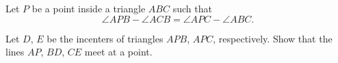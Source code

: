 Let $ P$ be a point inside a triangle $ ABC$ such that
\[ \angle APB - \angle ACB = \angle APC - \angle ABC.\]

Let $ D$,  $ E$ be the incenters of triangles $ APB$,  $ APC$,  respectively. Show that the lines $ AP$,  $ BD$,  $ CE$ meet at a point.
